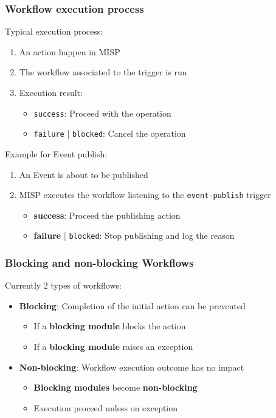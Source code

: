\begin{frame}
    \frametitle{Workflow execution process}
    Typical execution process:
    \begin{enumerate}
        \item An action happen in MISP
        \item The workflow associated to the trigger is run
        \item Execution result:
        \begin{itemize}
            \item \texttt{\color{green!50!black}success}: Proceed with the operation
            \item \texttt{\color{red}failure} | \texttt{\color{blue}blocked}: Cancel the operation
        \end{itemize}
    \end{enumerate}
    \vspace{0.5em}
    Example for Event publish:
    \begin{enumerate}
        \item An Event is about to be published
        \item MISP executes the workflow listening to the \texttt{event-publish} trigger
        \begin{itemize}
            \item {\bf\color{green!50!black}success}: Proceed the publishing action
            \item {\bf\color{red}failure} | \texttt{\color{blue}blocked}: Stop publishing and log the reason
        \end{itemize}
    \end{enumerate}
\end{frame}

\begin{frame}
    \frametitle{Blocking and non-blocking Workflows}
    Currently 2 types of workflows:
    \vspace{0.5em}
    \begin{itemize}
        \item {\bf Blocking}: Completion of the initial action can be prevented
        \begin{itemize}
            \item If a \textbf{blocking module} blocks the action
            \item If a \textbf{blocking module} raises an exception
        \end{itemize}
        \vspace{0.5em}
        \item {\bf Non-blocking}: Workflow execution outcome has no impact
        \begin{itemize}
            \item \textbf{Blocking modules} become \textbf{non-blocking}
            \item Execution proceed unless on exception
        \end{itemize}
    \end{itemize}
\end{frame}

